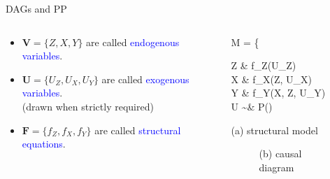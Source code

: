 %
%
\begin{frame}
	{DAGs and PP}
	\begin{columns}
		\begin{column}{0.5\textwidth}
			\begin{itemize}
				\item $\pmb{V}=\{Z,X,Y\}$ are called \textcolor{blue}{endogenous variables}.
				\item $\pmb{U}=\{U_{Z},U_{X},U_{Y}\}$ are called \textcolor{blue}{exogenous variables}. \\
				{\small \alert{(drawn when strictly required)} }
				\item $\pmb{F}=\{f_{Z},f_{X},f_{Y}\}$ are called \textcolor{blue}{structural equations}.
			\end{itemize}
		\end{column}
		\begin{column}{0.5\textwidth}  
			\begin{equ}
				M = \left\{ \begin{aligned} 
					Z \leftarrow & \; f_{Z}(U_{Z}) \\
					X \leftarrow & \; f_{X}(Z, U_{X}) \\
					Y \leftarrow & \; f_{Y}(X, Z, U_{Y}) \\
					U \sim & \; P()
				\end{aligned} \right
				\caption*{(a) structural model}
			\end{equ}
			\begin{figure}
				\caption*{(b) causal diagram }
			\end{figure}
		\end{column}
	\end{columns}
\end{frame}
